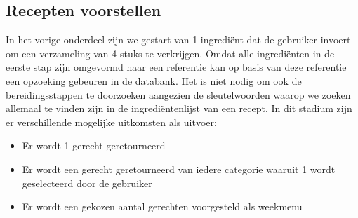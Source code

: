 \documentclass{hogent-article}
\begin{document}
\subsection{Recepten voorstellen}%

In het vorige onderdeel zijn we gestart van 1 ingrediënt dat de gebruiker invoert om een verzameling van 4 stuks te verkrijgen. Omdat alle ingrediënten in de eerste stap zijn omgevormd naar een referentie kan op basis van deze referentie een opzoeking gebeuren in de databank. Het is niet nodig om ook de bereidingsstappen te doorzoeken aangezien de sleutelwoorden waarop we zoeken allemaal te vinden zijn in de ingrediëntenlijst van een recept. In dit stadium zijn er verschillende mogelijke uitkomsten als uitvoer:

\begin{itemize}
    \item Er wordt 1 gerecht geretourneerd
    \item Er wordt een gerecht geretourneerd van iedere categorie waaruit 1 wordt geselecteerd door de gebruiker
    \item Er wordt een gekozen aantal gerechten voorgesteld als weekmenu
\end{itemize}
\end{document}

